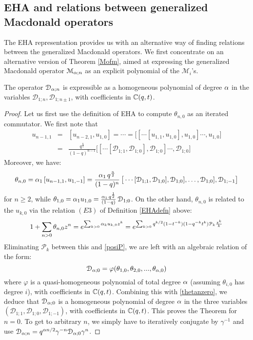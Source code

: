 \subsection{EHA and relations between generalized Macdonald operators}

The EHA representation provides us with an alternative way of finding relations 
between the generalized Macdonald operators. We first concentrate on an alternative version
of Theorem \ref{Mofm}, aimed at expressing the generalized Macdonald operator ${\mathcal M}_{{\alpha};n}$
as an explicit polynomial of the ${\mathcal M}_i$'s.


\begin{thm}\label{polpol}
The operator ${\mathcal D}_{{\alpha};n}$ is expressible as a homogeneous polynomial of degree ${\alpha}$ in the variables
${\mathcal D}_{1;n},{\mathcal D}_{1;n\pm 1}$, with coefficients in ${\mathbb C}(q,t)$.
\end{thm}
\begin{proof}
Let us first use the definition of EHA to compute $\theta_{n,0}$ as an iterated commutator. We first note that
\begin{eqnarray*}u_{n-1,1}&=&[u_{n-2,1},u_{1,0}]=\cdots=\big[ [\cdots [ u_{1,1},u_{1,0}],u_{1,0}]\cdots , u_{1,0}\big]\\
&=&\frac{q^{\frac{n}{2}}}{(1-q)^{n-1}}
\big[ [\cdots [ {\mathcal D}_{1;1},{\mathcal D}_{1;0}],{\mathcal D}_{1;0}]\cdots , {\mathcal D}_{1;0}\big]
\end{eqnarray*}
Moreover, we have:
\begin{equation}\label{thetanzero}
\theta_{n,0}={\alpha}_1\, [u_{n-1,1},u_{1,-1}]=\frac{{\alpha}_1\, q^{\frac{n}{2}}}{(1-q)^n}\,
\big[\cdots [{\mathcal D}_{1;1},{\mathcal D}_{1;0}],{\mathcal D}_{1;0}],\ldots ,{\mathcal D}_{1;0}],{\mathcal D}_{1;-1}\big]
\end{equation}
for $n\geq 2$, while $\theta_{1,0}={\alpha}_1 u_{1,0}=\frac{{\alpha}_1\, q^{\frac{1}{2}}}{(1-q)}\,{\mathcal D}_{1;0}$.
On the other hand, $\theta_{n,0}$ is related to the $u_{k,0}$ via the relation $(E3)$ of Definition \ref{EHAdefn} above:
\begin{equation}\label{Ptotheta}
1+\sum_{n>0} \theta_{n,0} z^n=e^{\sum_{k>0} {\alpha}_k u_{k,0} z^k} =
e^{\sum_{k>0} q^{k/2} (1-t^{-k})(1-q^{-k}t^k){\mathcal P}_k\frac{z^k}{k}}
\end{equation}
Eliminating ${\mathcal P}_k$ between this and \eqref{posiP}, we are left with an algebraic relation of the form:
$$ {\mathcal D}_{{\alpha};0}=\varphi(\theta_{1,0},\theta_{2,0},...,\theta_{{\alpha},0})$$
where $\varphi$ is a quasi-homogeneous polynomial of total degree ${\alpha}$ 
(assuming $\theta_{i,0}$ has degree $i$), with coefficients in ${\mathbb C}(q,t)$. 
Combining this with \eqref{thetanzero}, we deduce that 
${\mathcal D}_{{\alpha};0}$ is a homogeneous polynomial of  degree ${\alpha}$ in the three variables
$({\mathcal D}_{1;1},{\mathcal D}_{1;0},{\mathcal D}_{1;-1})$, with coefficients in ${\mathbb C}(q,t)$. 
This proves the Theorem for $n=0$. 
To get to arbitrary $n$, we simply have to iteratively conjugate by $\gamma^{-1}$ and use  ${\mathcal D}_{{\alpha};n}=
q^{{\alpha} n/2} \gamma^{-n} {\mathcal D}_{{\alpha};0}\gamma^n$.
\end{proof}

